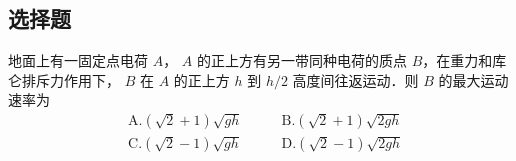 
\subsection{选择题}
地面上有一固定点电荷 $A$， $A$ 的正上方有另一带同种电荷的质点 $B$，在重力和库仑排斥力作用下， $B$ 在 $A$ 的正上方 $h$ 到 $h/2$ 高度间往返运动．则 $B$ 的最大运动速率为\\
\begin{equation}
\begin{aligned}
&\mathrm{A}. (\sqrt{2}+1) \sqrt{g h}\qquad
&\mathrm{B}. (\sqrt{2}+1) \sqrt{2 g h}\\
&\mathrm{C}. (\sqrt{2}-1) \sqrt{g h}\quad
&\mathrm{D}. (\sqrt{2}-1) \sqrt{2 g h}
\end{aligned}
\end{equation}